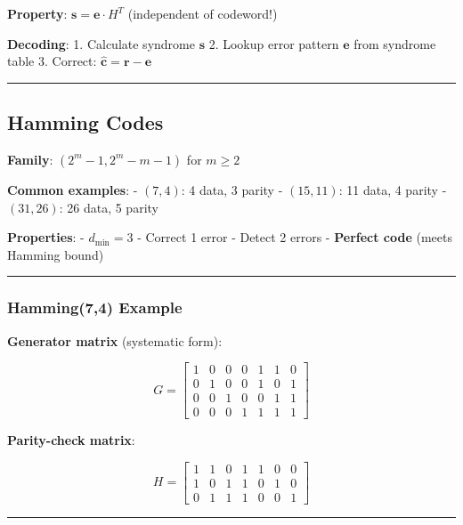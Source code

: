\textbf{Property}: \(\mathbf{s} = \mathbf{e} \cdot H^T\) (independent of
codeword!)

\textbf{Decoding}: 1. Calculate syndrome \(\mathbf{s}\) 2. Lookup error
pattern \(\mathbf{e}\) from syndrome table 3. Correct:
\(\hat{\mathbf{c}} = \mathbf{r} - \mathbf{e}\)

\begin{center}\rule{0.5\linewidth}{0.5pt}\end{center}

\subsection{Hamming Codes}\label{hamming-codes}

\textbf{Family}: \((2^m - 1, 2^m - m - 1)\) for \(m \geq 2\)

\textbf{Common examples}: - \((7, 4)\): 4 data, 3 parity - \((15, 11)\):
11 data, 4 parity - \((31, 26)\): 26 data, 5 parity

\textbf{Properties}: - \(d_{\min} = 3\) - Correct 1 error - Detect 2
errors - \textbf{Perfect code} (meets Hamming bound)

\begin{center}\rule{0.5\linewidth}{0.5pt}\end{center}

\subsubsection{Hamming(7,4) Example}\label{hamming74-example}

\textbf{Generator matrix} (systematic form):

\[
G = \begin{bmatrix}
1 & 0 & 0 & 0 & 1 & 1 & 0 \\
0 & 1 & 0 & 0 & 1 & 0 & 1 \\
0 & 0 & 1 & 0 & 0 & 1 & 1 \\
0 & 0 & 0 & 1 & 1 & 1 & 1
\end{bmatrix}
\]

\textbf{Parity-check matrix}:

\[
H = \begin{bmatrix}
1 & 1 & 0 & 1 & 1 & 0 & 0 \\
1 & 0 & 1 & 1 & 0 & 1 & 0 \\
0 & 1 & 1 & 1 & 0 & 0 & 1
\end{bmatrix}
\]

\begin{center}\rule{0.5\linewidth}{0.5pt}\end{center}

